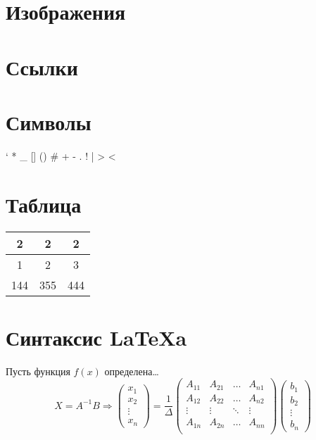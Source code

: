 \section{\textbf{Изображения}}



\section{\textbf{Ссылки}}


\section{\textbf{Символы}}

` * \_ {} [] () \# + - . ! | > <
\section{\textbf{Таблица}}
\begin{center}
\begin{tabular}{|c|c|c|}
\hline



\textbf{2}&\textbf{2}&\textbf{2}\\
\hline



1&2&3\\

144&355&444\\

\hline
\end{tabular}
\end{center}
\section{\textbf{Синтаксис LaTeXa}}

Пусть функция $f(x)$ определена… $$X = A^{-1}B \Rightarrow \begin{pmatrix}x_1\\x_2\\\vdots\\x_n\end{pmatrix} = \frac{1}{\Delta}
\begin{pmatrix}
    A_{11}&A_{21}&\ldots&A_{n1}\\
    A_{12}&A_{22}&\ldots&A_{n2}\\
    \vdots&\vdots&\ddots&\vdots\\
    A_{1n}&A_{2n}&\ldots&A_{nn}\\
\end{pmatrix}
\begin{pmatrix}b_1\\b_2\\\vdots\\b_n\end{pmatrix}
$$
